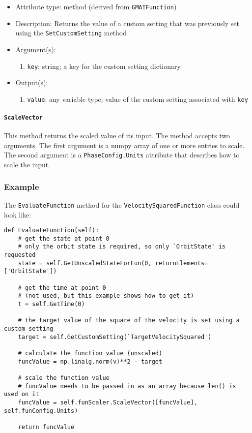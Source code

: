 \documentclass[]{article}
\begin{document}
\begin{itemize}
	\item Attribute type: method (derived from \texttt{GMATFunction})
	\item Description: Returns the value of a custom setting that was previously set using the \texttt{SetCustomSetting} method
	\item Argument(s):
	\begin{enumerate}
		\item \texttt{key}: string; a key for the custom setting dictionary
	\end{enumerate}
	\item Output(s):
	\begin{enumerate}
		\item \texttt{value}: any variable type; value of the custom setting associated with \texttt{key}
	\end{enumerate}
\end{itemize}

\paragraph{\texttt{ScaleVector}}

This method returns the scaled value of its input. The method accepts two arguments. The first argument is a numpy array of one or more entries to scale. The second argument is a \texttt{PhaseConfig.Units} attribute that describes how to scale the input.

\subsubsection{Example}

The \texttt{EvaluateFunction} method for the \texttt{VelocitySquaredFunction} class could look like:

\begin{verbatim}
def EvaluateFunction(self):
    # get the state at point 0
    # only the orbit state is required, so only `OrbitState' is requested
    state = self.GetUnscaledStateForFun(0, returnElements=['OrbitState'])
    
    # get the time at point 0
    # (not used, but this example shows how to get it)
    t = self.GetTime(0) 
    
    # the target value of the square of the velocity is set using a custom setting
    target = self.GetCustomSetting(`TargetVelocitySquared')
    
    # calculate the function value (unscaled)
    funcValue = np.linalg.norm(v)**2 - target 
    
    # scale the function value
    # funcValue needs to be passed in as an array because len() is used on it
    funcValue = self.funScaler.ScaleVector([funcValue], self.funConfig.Units) 
    
    return funcValue
    
\end{verbatim}
\end{document}
